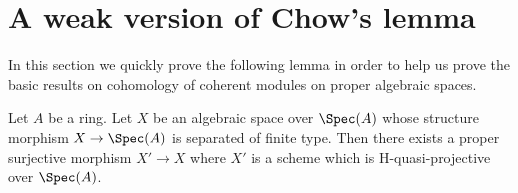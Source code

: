 \section{A weak version of Chow's lemma}
\label{section-weak-chow}

\noindent
In this section we quickly prove the following lemma in order
to help us prove the basic results on cohomology of coherent
modules on proper algebraic spaces.

\begin{lemma}
\label{lemma-weak-chow}
Let $A$ be a ring. Let $X$ be an algebraic space over $\Spec(A)$
whose structure morphism $X \to \Spec(A)$ is separated of finite type.
Then there exists a proper surjective morphism $X' \to X$
where $X'$ is a scheme which is H-quasi-projective over $\Spec(A)$.
\end{lemma}

